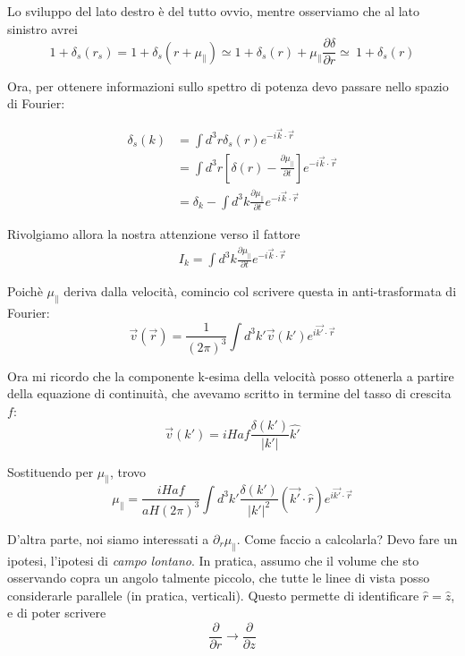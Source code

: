\documentclass{report}
\begin{document}
Lo sviluppo del lato destro è del tutto ovvio, mentre osserviamo che al lato sinistro avrei 
\begin{equation}
    1 + \delta_s(r_s) = 1 + \delta_s(r + \mu_{\parallel}) \simeq 1 + \delta_s(r) + \mu_{\parallel} \frac{\partial \delta}{\partial r } \simeq \ 1 + \delta_s(r)
\end{equation}

Ora, per ottenere informazioni sullo spettro di potenza devo passare nello spazio di Fourier: 

\begin{align}
    \delta_s(k) &= \int d^3r \delta_s(r)e^{-i\vec{k}\cdot \vec{r}} \\
    &= \int d^3r \left[\delta(r) - \frac{\partial \mu_{\parallel}}{\partial t}\right]e^{-i\vec{k}\cdot \vec{r}} \\
    &= \delta_k - \int d^3k \frac{\partial \mu_{\parallel}}{\partial t}e^{-i\vec{k}\cdot \vec{r}}
\end{align}

Rivolgiamo allora la nostra attenzione verso il fattore 
\begin{align}
    I_k = \int d^3k \frac{\partial \mu_{\parallel}}{\partial t}e^{-i\vec{k}\cdot \vec{r}}
\end{align}

Poichè $\mu_{\parallel}$ deriva dalla velocità, comincio col scrivere questa in anti-trasformata di Fourier: 
\begin{equation}
    \vec{v}(\vec{r}) = \frac{1}{(2\pi)^3}\int d^3k' \vec{v}(k')e^{i\vec{k'}\cdot \vec{r}}
\end{equation}

Ora mi ricordo che la componente k-esima della velocità posso ottenerla a partire della equazione di continuità, che avevamo scritto in termine del tasso di crescita $f$: 
\begin{equation}
    \vec{v}(k') = iHaf \frac{\delta(k')}{|k'|}\hat{k'}
\end{equation}

Sostituendo per $\mu_{\parallel}$, trovo 
\begin{equation}
    \mu_\parallel = \frac{iHaf}{aH(2\pi)^3}\int d^3k' \frac{\delta(k')}{|k'|^2}(\vec{k'}\cdot \hat{r})e^{i\vec{k'}\cdot \vec{r}}
\end{equation}

D'altra parte, noi siamo interessati a $\partial_r \mu_{\parallel}$. Come faccio a calcolarla? Devo fare un ipotesi, l'ipotesi di \emph{campo lontano}. In pratica, assumo che il volume che sto osservando copra un angolo talmente piccolo, che tutte le linee di vista posso considerarle parallele (in pratica, verticali). Questo permette di identificare $\hat{r} = \hat{z}$, e di poter scrivere 
\begin{equation}
    \frac{\partial}{\partial r} \rightarrow \frac{\partial }{\partial z}
\end{equation}
\end{document}
